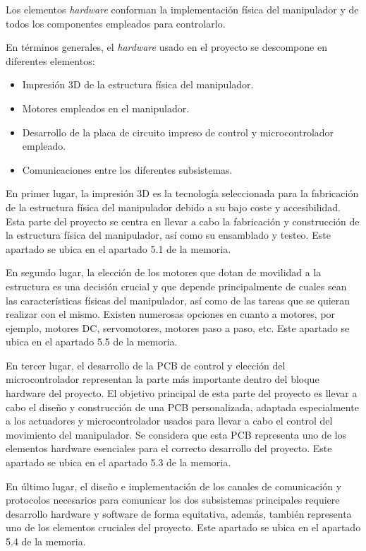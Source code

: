 Los elementos \textit{hardware} conforman la implementación física del manipulador y de todos los componentes empleados para controlarlo.

En términos generales, el \textit{hardware} usado en el proyecto se descompone en diferentes elementos:
\begin{itemize}
    \item Impresión 3D de la estructura física del manipulador.
    \item Motores empleados en el manipulador.
    \item Desarrollo de la placa de circuito impreso de control y microcontrolador empleado.
    \item Comunicaciones entre los diferentes subsistemas.
\end{itemize}

En primer lugar, la impresión 3D es la tecnología seleccionada para la fabricación de la estructura física del manipulador debido a su bajo coste y accesibilidad. Esta parte del proyecto se centra en llevar a cabo la fabricación y construcción de la estructura física del manipulador, así como su ensamblado y testeo. Este apartado se ubica en el apartado 5.1 de la memoria.

En segundo lugar, la elección de los motores que dotan de movilidad a la estructura es una decisión crucial y que depende principalmente de cuales sean las características físicas del manipulador, así como de las tareas que se quieran realizar con el mismo. Existen numerosas opciones en cuanto a motores, por ejemplo, motores DC, servomotores, motores paso a paso, etc. Este apartado se ubica en el apartado 5.5 de la memoria.

En tercer lugar, el desarrollo de la PCB de control y elección del microcontrolador representan la parte más importante dentro del bloque hardware del proyecto. El objetivo principal de esta parte del proyecto es llevar a cabo el diseño y construcción de una PCB personalizada, adaptada especialmente a los actuadores y microcontrolador usados para llevar a cabo el control del movimiento del manipulador. Se considera que esta PCB representa uno de los elementos hardware esenciales para el correcto desarrollo del proyecto. Este apartado se ubica en el apartado 5.3 de la memoria.

En último lugar, el diseño e implementación de los canales de comunicación y protocolos necesarios para comunicar los dos subsistemas principales requiere desarrollo hardware y software de forma equitativa, además, también representa uno de los elementos cruciales del proyecto. Este apartado se ubica en el apartado 5.4 de la memoria.





